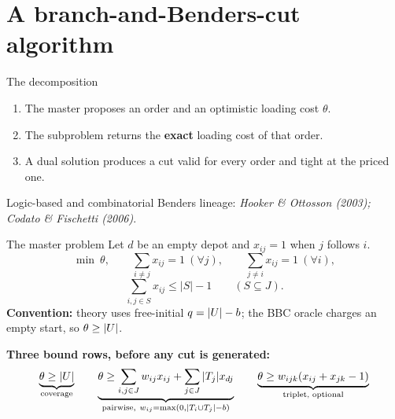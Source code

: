 \renewcommand{\sectionblurb}{Hand the easy half to an exact oracle, and let the hard half be searched. Where the cuts come from, and what they can say.}
\section{A branch-and-Benders-cut algorithm}

\begin{frame}{The decomposition}
\vspace{0.06cm}
\begingroup\centering
\scalebox{.95}{}
\par\endgroup
\vspace{0.19cm}
\begin{enumerate}\itemsep3pt
  \item The master proposes an order and an optimistic loading cost $\theta$.
  \item The subproblem returns the \textbf{exact} loading cost of that order.
  \item A dual solution produces a cut valid for every order and tight at the priced one.
\end{enumerate}
\vspace{0.12cm}
\centering\small
Logic-based and combinatorial Benders lineage:
{\itshape\color{muted}Hooker \& Ottosson (2003); Codato \& Fischetti (2006)}.
\end{frame}

\begin{frame}{The master problem}
\vspace{0.12cm}
Let $d$ be an empty depot and $x_{ij}=1$ when $j$ follows $i$.
\[
\min\ \theta,\qquad
\sum_{i\ne j}x_{ij}=1\ (\forall j),\qquad
\sum_{j\ne i}x_{ij}=1\ (\forall i),
\]
\[
\sum_{i,j\in S}x_{ij}\le |S|-1 \qquad(S\subseteq J).
\]
\vspace{0.08cm}
\textbf{Convention:} theory uses free-initial $q=|U|-b$; the BBC oracle charges an
empty start, so $\theta\ge|U|$.

\vspace{0.1cm}
\textbf{Three bound rows, before any cut is generated:}
\[
\underbrace{\theta\ge|U|}_{\text{coverage}}
\qquad
\underbrace{\theta\ge \sum_{i,j\in J}w_{ij}x_{ij}+\sum_{j\in J}|T_j|x_{dj}}_{\text{pairwise},\ w_{ij}=\max(0,|T_i\cup T_j|-b)}
\qquad
\underbrace{\theta\ge w_{ijk}(x_{ij}+x_{jk}-1)}_{\text{triplet, optional}}
\]
\vspace{-0.1cm}

\end{frame}

